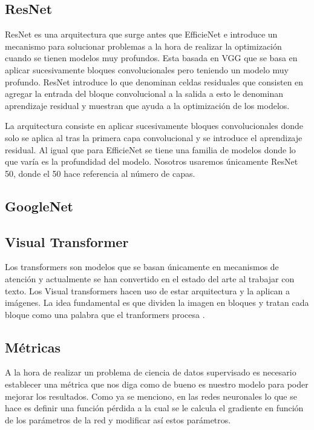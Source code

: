 \documentclass[a4paper,12pt,twoside,titlepage]{article}
\begin{document}
\subsection*{ResNet}

ResNet es una arquitectura que surge antes que EfficieNet e introduce un mecanismo para solucionar problemas a la hora de realizar la optimización cuando se tienen modelos muy profundos. Esta basada en VGG \cite{} que se basa en aplicar sucesivamente bloques convolucionales pero teniendo un modelo muy profundo. ResNet introduce lo que denominan celdas residuales que consisten en agregar la entrada del bloque convolucional a la salida \cite{} a esto le denominan aprendizaje residual y muestran que ayuda a la optimización de los modelos.

La arquitectura consiste en aplicar sucesivamente bloques convolucionales donde solo se aplica al tras la primera capa convolucional y se introduce el aprendizaje residual. Al igual que para EfficieNet se tiene una familia de modelos donde lo que varía es la profundidad del modelo. Nosotros usaremos únicamente ResNet 50, donde el 50 hace referencia al número de capas.

\subsection*{GoogleNet}

\subsection*{Visual Transformer}

Los transformers \cite{} son modelos que se basan únicamente en mecanismos de atención y actualmente se han convertido en el estado del arte al trabajar con texto. Los Visual transformers hacen uso de estar arquitectura y la aplican a imágenes. La idea fundamental es que dividen la imagen en bloques y tratan cada bloque como una palabra que el tranformers procesa \cite{}.

\subsection{Métricas}

A la hora de realizar un problema de ciencia de datos supervisado es necesario establecer una métrica que nos diga como de bueno es nuestro modelo para poder mejorar los resultados. Como ya se menciono, en las redes neuronales lo que se hace es definir una función pérdida a la cual se le calcula el gradiente en función de los parámetros de la red y modificar así estos parámetros.
\end{document}
